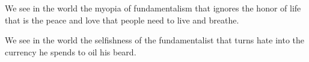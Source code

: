 

We see in the world the myopia of fundamentalism that ignores the
honor of life that is the peace and love that people need to live and
breathe.

We see in the world the selfishness of the fundamentalist that turns
hate into the currency he spends to oil his beard.

\bye
